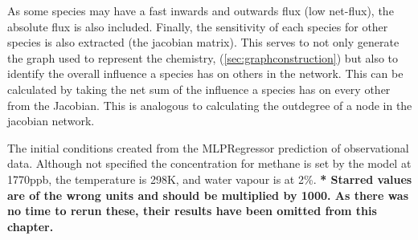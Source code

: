 As some species may have a fast inwards and outwards flux (low net-flux), the absolute flux is also included. Finally, the sensitivity of each species for other species is also extracted (the jacobian matrix). This serves to not only generate the graph used to represent the chemistry, (\autoref{sec:graphconstruction}) but also to identify the overall influence a species has on others in the network. This can be calculated by taking the net sum of the influence a species has on every other from the Jacobian. This is analogous to calculating the outdegree of a node in the jacobian network. 
\newpage
 
\begin{table}[H]
\centering
\small

\caption{The initial conditions created from the MLPRegressor prediction of observational data. Although not specified the concentration for methane is set by the model at 1770ppb, the temperature is 298K, and water vapour is at 2\%. \textbf{* Starred values are of the wrong units and should be multiplied by 1000. As there was no time to rerun these, their results have been omitted from this chapter.}}
\label{tab:icsmetric}
\end{table}

\newpage


% 

% 
% 
% 



